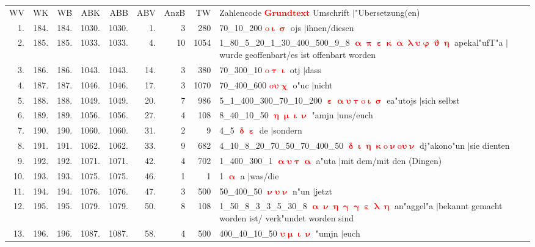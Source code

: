 \documentclass[a4paper,10pt,landscape]{article}
\begin{document}
\begin{tabular}{rrrrrrrrp{120mm}}
WV&WK&WB&ABK&ABB&ABV&AnzB&TW&Zahlencode \textcolor{red}{$\boldsymbol{Grundtext}$} Umschrift $|$"Ubersetzung(en)\\
1.&184.&184.&1030.&1030.&1.&3&280&70\_10\_200 \textcolor{red}{$\boldsymbol{\mathrm{o}\upiota\upsigma}$} ojs $|$ihnen/diesen\\
2.&185.&185.&1033.&1033.&4.&10&1054&1\_80\_5\_20\_1\_30\_400\_500\_9\_8 \textcolor{red}{$\boldsymbol{\upalpha\uppi\upepsilon\upkappa\upalpha\uplambda\upsilon\upvarphi\upvartheta\upeta}$} apekal"ufT"a $|$wurde geoffenbart/es ist offenbart worden\\
3.&186.&186.&1043.&1043.&14.&3&380&70\_300\_10 \textcolor{red}{$\boldsymbol{\mathrm{o}\uptau\upiota}$} otj $|$dass\\
4.&187.&187.&1046.&1046.&17.&3&1070&70\_400\_600 \textcolor{red}{$\boldsymbol{\mathrm{o}\upsilon\upchi}$} o"uc $|$nicht\\
5.&188.&188.&1049.&1049.&20.&7&986&5\_1\_400\_300\_70\_10\_200 \textcolor{red}{$\boldsymbol{\upepsilon\upalpha\upsilon\uptau\mathrm{o}\upiota\upsigma}$} ea"utojs $|$sich selbst\\
6.&189.&189.&1056.&1056.&27.&4&108&8\_40\_10\_50 \textcolor{red}{$\boldsymbol{\upeta\upmu\upiota\upnu}$} "amjn $|$uns/euch\\
7.&190.&190.&1060.&1060.&31.&2&9&4\_5 \textcolor{red}{$\boldsymbol{\updelta\upepsilon}$} de $|$sondern\\
8.&191.&191.&1062.&1062.&33.&9&682&4\_10\_8\_20\_70\_50\_70\_400\_50 \textcolor{red}{$\boldsymbol{\updelta\upiota\upeta\upkappa\mathrm{o}\upnu\mathrm{o}\upsilon\upnu}$} dj"akono"un $|$sie dienten\\
9.&192.&192.&1071.&1071.&42.&4&702&1\_400\_300\_1 \textcolor{red}{$\boldsymbol{\upalpha\upsilon\uptau\upalpha}$} a"uta $|$mit dem/mit den (Dingen)\\
10.&193.&193.&1075.&1075.&46.&1&1&1 \textcolor{red}{$\boldsymbol{\upalpha}$} a $|$was/die\\
11.&194.&194.&1076.&1076.&47.&3&500&50\_400\_50 \textcolor{red}{$\boldsymbol{\upnu\upsilon\upnu}$} n"un $|$jetzt\\
12.&195.&195.&1079.&1079.&50.&8&108&1\_50\_8\_3\_3\_5\_30\_8 \textcolor{red}{$\boldsymbol{\upalpha\upnu\upeta\upgamma\upgamma\upepsilon\uplambda\upeta}$} an"aggel"a $|$bekannt gemacht worden ist/ verk"undet worden sind\\
13.&196.&196.&1087.&1087.&58.&4&500&400\_40\_10\_50 \textcolor{red}{$\boldsymbol{\upsilon\upmu\upiota\upnu}$} "umjn $|$euch\\

\end{tabular}
\end{document}
